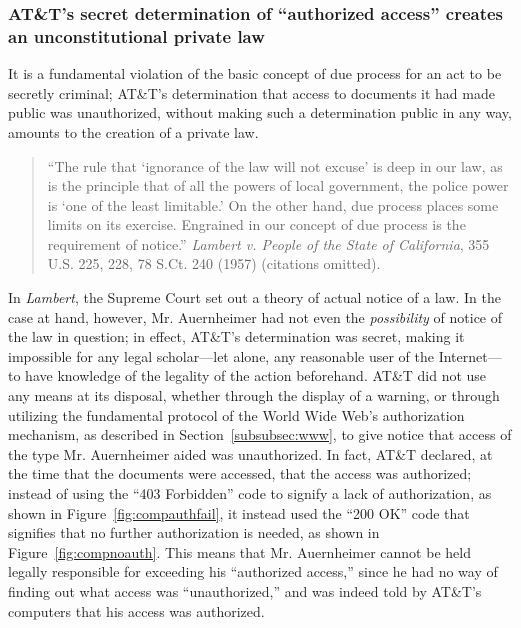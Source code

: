 \documentclass{article}
\begin{document}
	\subsubsection{AT\&T's secret determination of ``authorized access'' creates an unconstitutional private law}
	
	It is a fundamental violation of the basic concept of due process for an act to be secretly criminal; AT\&T's determination that access to documents it had made public was unauthorized, without making such a determination public in any way, amounts to the creation of a private law. 
	
	\begin{quote}
		\begin{singlespace}
			\fontsize{14}{17}\selectfont
	``The rule that `ignorance of the law will not excuse' is deep in our law, as is the principle that of all the powers of local government, the police power is `one of the least limitable.' On the other hand, due process places some limits on its exercise. Engrained in our concept of due process is the requirement of notice.'' \emph{Lambert v. People of the State of California}, 355 U.S. 225, 228, 78 S.Ct. 240 (1957) (citations omitted).
		\end{singlespace}
	\end{quote}
	
	 In \emph{Lambert}, the Supreme Court set out a theory of actual notice of a law. In the case at hand, however, Mr. Auernheimer had not even the \emph{possibility} of notice of the law in question; in effect, AT\&T's determination was secret, making it impossible for any legal scholar---let alone, any reasonable user of the Internet---to have knowledge of the legality of the action beforehand. AT\&T did not use any means at its disposal, whether through the display of a warning, or through utilizing the fundamental protocol of the World Wide Web's authorization mechanism, as described in Section~\ref{subsubsec:www}, to give notice that access of the type Mr. Auernheimer aided was unauthorized. In fact, AT\&T declared, at the time that the documents were accessed, that the access was authorized; instead of using the ``403 Forbidden'' code to signify a lack of authorization, as shown in Figure~\ref{fig:compauthfail}, it instead used the ``200 OK'' code that signifies that no further authorization is needed, as shown in Figure~\ref{fig:compnoauth}. This means that Mr. Auernheimer cannot be held legally responsible for exceeding his ``authorized access,'' since he had no way of finding out what access was ``unauthorized,'' and was indeed told by AT\&T's computers that his access was authorized.
	 
\end{document}

